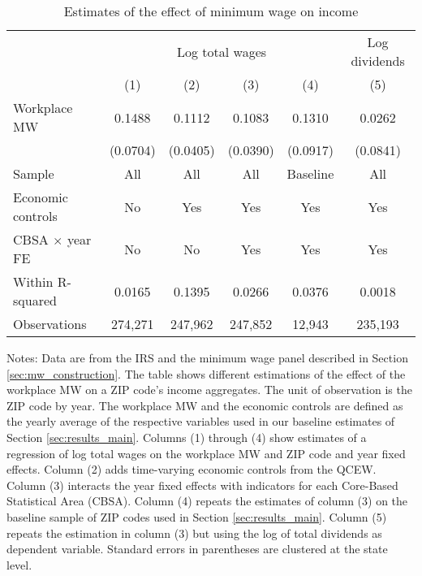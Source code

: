 \begin{table}[hbt!]
    \centering
    \caption{Estimates of the effect of minimum wage on income}
    \label{tab:static_wages}

    \begin{tabular}{@{}lccccc@{}}
        \toprule
                                & \multicolumn{4}{c}{Log total wages}
                                & \multicolumn{1}{c}{Log dividends}                        \\ \cmidrule(lr){2-5}\cmidrule(lr){6-6}
                                & (1)       & (2)      & (3)      & (4)       & (5)        \\ \midrule
        Workplace MW            & 0.1488       & 0.1112      & 0.1083      & 0.1310       & 0.0262        \\
                                & (0.0704)     & (0.0405)    & (0.0390)    & (0.0917)     & (0.0841)      \\ \midrule
        Sample                  & All       & All      & All      & Baseline  & All        \\
        Economic controls       & No        & Yes      & Yes      & Yes       & Yes        \\
        CBSA $\times$ year FE   & No        & No       & Yes      & Yes       & Yes        \\
        Within R-squared        & 0.0165       & 0.1395      & 0.0266      & 0.0376       & 0.0018        \\
        Observations            & 274,271      & 247,962     & 247,852     & 12,943      & 235,193       \\ \bottomrule
    \end{tabular}

    \begin{minipage}{.95\textwidth} \footnotesize
        \vspace{2mm}
        Notes: 
        Data are from the IRS and the minimum wage panel described in Section 
        \ref{sec:mw_construction}.
        The table shows different estimations of the effect of the workplace MW
        on a ZIP code's income aggregates.
        The unit of observation is the ZIP code by year.
        The workplace MW and the economic controls are defined as the yearly 
        average of the respective variables used in our baseline estimates of 
        Section \ref{sec:results_main}.
        Columns (1) through (4) show estimates of a regression of log total wages
        on the workplace MW and ZIP code and year fixed effects.
        Column (2) adds time-varying economic controls from the QCEW.
        Column (3) interacts the year fixed effects with indicators for each
        Core-Based Statistical Area (CBSA).
        Column (4) repeats the estimates of column (3) on the baseline sample
        of ZIP codes used in Section \ref{sec:results_main}.
        Column (5) repeats the estimation in column (3) but using the log of 
        total dividends as dependent variable.
        Standard errors in parentheses are clustered at the state level.
    \end{minipage}
\end{table}

